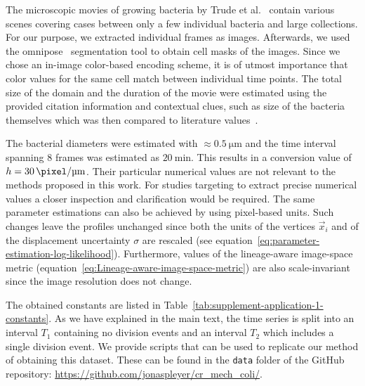 The microscopic movies of growing bacteria by Trude et al.~\cite{Trude1982} contain various scenes
covering cases between only a few individual bacteria and large collections.
For our purpose, we extracted individual frames as images.
Afterwards, we used the omnipose~\cite{Cutler2022} segmentation tool to obtain cell masks of the
images. Since we chose an in-image color-based encoding scheme, it is of utmost importance that
color values for the same cell match between individual time points.
The total size of the domain and the duration of the movie were estimated using the provided citation
information and contextual clues, such as size of the bacteria themselves which was then compared to
literature values~\cite{Nelson2000}.

The bacterial diameters were estimated with $\approx\SI{0.5}{\micro\metre}$ and the time
interval spanning $8$ frames was estimated as $\SI{20}{\minute}$.
This results in a conversion value of $h=\SI{30}{\pixel\per\micro\metre}$.
Their particular numerical values are not relevant to the methods proposed in this work.
For studies targeting to extract precise numerical
values a closer inspection and clarification would be required.
The same parameter estimations can also be achieved by using pixel-based units.
Such changes leave the profiles unchanged since both the units of the vertices $\vec{x}_i$ and
of the displacement uncertainty $\sigma$ are rescaled (see
equation~\ref{eq:parameter-estimation-log-likelihood}).
Furthermore, values of the lineage-aware image-space metric
(equation~\ref{eq:Lineage-aware-image-space-metric}) are also scale-invariant since the image
resolution does not change.

The obtained constants are listed in Table~\ref{tab:supplement-application-1-constants}.
As we have explained in the main text, the time series is split into an interval $T_1$ containing no
division events and an interval $T_2$ which includes a single division event.
We provide scripts that can be used to replicate our method of obtaining this dataset.
These can be found in the \texttt{data} folder of the GitHub repository:
\url{https://github.com/jonaspleyer/cr_mech_coli/}.

